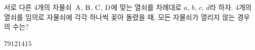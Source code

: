\hspace*{2mm}\begin{minipage}[t]{\dimexpr\linewidth-2mm\relax}\vspace{0pt}
서로 다른 $4$개의 자물쇠~$\mathrm{A}$, $\mathrm{B}$, $\mathrm{C}$, $\mathrm{D}$에 맞는 열쇠를 차례대로 $a$, $b$, $c$, $d$라 하자. $4$개의 열쇠를 임의로 자물쇠에 각각 하나씩 꽂아 돌렸을 때, 모든 자물쇠가 열리지 않는 경우의 수는?
\begin{choices32}{$7$}{$9$}{$12$}{$14$}{$15$}\end{choices32}\end{minipage}
